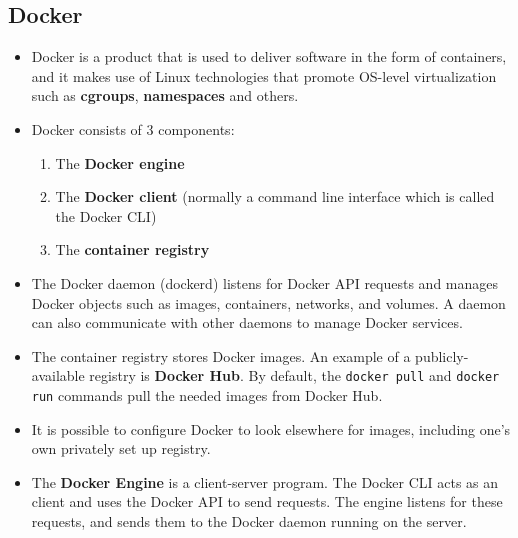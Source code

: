\documentclass{article}
\begin{document}
\subsection{Docker}
\begin{itemize}
    \item Docker is a product that is used to deliver software in the form of containers, and it makes use of Linux technologies that promote OS-level virtualization such as \textbf{cgroups}, \textbf{namespaces} and others. 
    
    \item Docker consists of 3 components:
    \begin{enumerate}
        \item The \textbf{Docker engine}
        
        \item The \textbf{Docker client} (normally a command line interface which is called the Docker CLI)
        
        \item The \textbf{container registry}
    \end{enumerate}
    
    \item The Docker daemon (dockerd) listens for Docker API requests and manages Docker objects such as images, containers, networks, and volumes. A daemon can also communicate with other daemons to manage Docker services.
    
    \item The container registry stores Docker images. An example of a publicly-available registry is \textbf{Docker Hub}. By default, the \texttt{docker pull} and \texttt{docker run} commands pull the needed images from Docker Hub. 
    
    \item It is possible to configure Docker to look elsewhere for images, including one's own privately set up registry. 
    
    \item The \textbf{Docker Engine} is a client-server program. The Docker CLI acts as an client and uses the Docker API to send requests. The engine listens for these requests, and sends them to the Docker daemon running on the server. 
\end{itemize}
\end{document}
